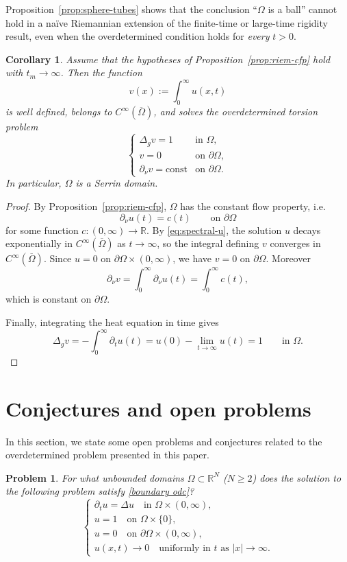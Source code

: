 \documentclass[a4paper,11pt]{article}
\newtheorem{corollary}[theorem]{Corollary}
\newtheorem{problem}{Problem}
\numberwithin{equation}{section}
\begin{document}
Proposition~\ref{prop:sphere-tubes} shows that the conclusion ``$\Omega$ is a
ball'' cannot hold in a na\"{i}ve Riemannian extension of the finite-time or
large-time rigidity result, even when the overdetermined condition holds for
\emph{every} $t>0$.

\begin{corollary}\label{cor:riem-serrin}
Assume that the hypotheses of Proposition~\ref{prop:riem-cfp} hold with
$t_m\to\infty$. Then the function
\[
v(x):=\int_0^\infty u(x,t)
\]
is well defined, belongs to $C^\infty(\overline\Omega)$, and solves the
overdetermined torsion problem
\[
\begin{cases}
\Delta_g v = 1 & \text{in }\Omega,\\
v=0 & \text{on }\partial\Omega,\\
\partial_\nu v = \text{const} & \text{on }\partial\Omega.
\end{cases}
\]
In particular, $\Omega$ is a Serrin domain.
\end{corollary}

\begin{proof}
By Proposition~\ref{prop:riem-cfp}, $\Omega$ has the constant flow property, i.e.
\[
\partial_\nu u(t)=c(t)\qquad\text{on }\partial\Omega
\]
for some function $c:(0,\infty)\to\mathbb R$. By \eqref{eq:spectral-u}, the
solution $u$ decays exponentially in $C^\infty(\overline\Omega)$ as
$t\to\infty$, so the integral defining $v$ converges in
$C^\infty(\overline\Omega)$. Since $u=0$ on $\partial\Omega\times (0,\infty)$,
we have $v=0$ on $\partial\Omega$. Moreover
\[
\partial_\nu v
=
\int_0^\infty \partial_\nu u(t)
=
\int_0^\infty c(t),
\]
which is constant on $\partial\Omega$.

Finally, integrating the heat equation in time gives
\[
\Delta_g v
=
-\int_0^\infty \partial_t u(t)
=
u(0)-\lim_{t\to\infty}u(t)
=
1
\qquad\text{in }\Omega.
\]
\end{proof}

\section{Conjectures and open problems}
In this section, we state some open problems and conjectures related to the overdetermined problem presented in this paper.

\begin{problem}\label{problem unbounded}
For what unbounded domains $\Omega\subset\mathbb{R}^N$ ($N\ge 2$) does the solution to the following problem satisfy \eqref{boundary odc}?
\begin{equation*}
  \begin{cases}
      \partial_t u= \Delta u \quad \text{in } \Omega\times (0,\infty),\\
      u=1 \quad \text{on }\Omega\times\{0\},\\
      u=0\quad \text{on }\partial\Omega\times(0,\infty),\\
      u(x,t)\to 0 \quad \text{uniformly in $t$ as $|x|\to \infty$}.
  \end{cases}  
\end{equation*}
\end{problem}
\end{document}
